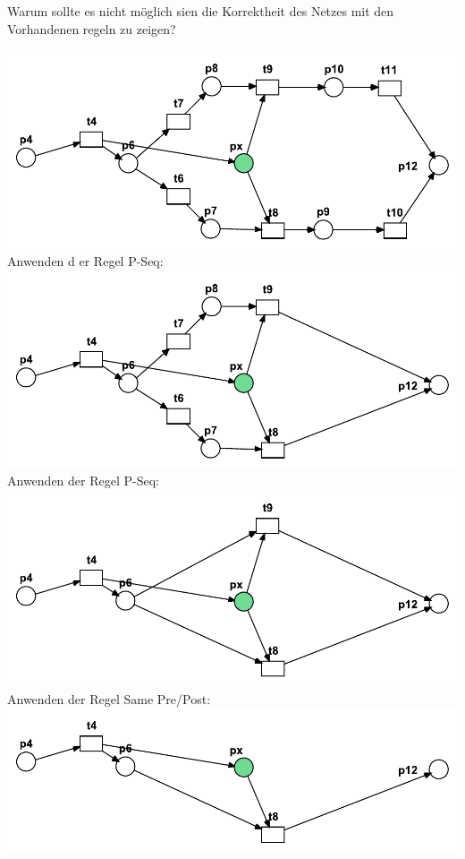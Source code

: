 Warum sollte es nicht möglich sien die Korrektheit des Netzes mit den Vorhandenen regeln zu zeigen?

 \includegraphics[scale=0.3]{Teilaufgaben/netz2.pdf}\\
 Anwenden d	er Regel P-Seq:\\
 \includegraphics[scale=0.3]{Teilaufgaben/pseq1-2.pdf}\\
  Anwenden der Regel P-Seq:\\
 \includegraphics[scale=0.3]{Teilaufgaben/pseq2-2.pdf}\\
 
   Anwenden der Regel Same Pre/Post:\\
 \includegraphics[scale=0.3]{Teilaufgaben/prepost1-2.pdf}\\
 
